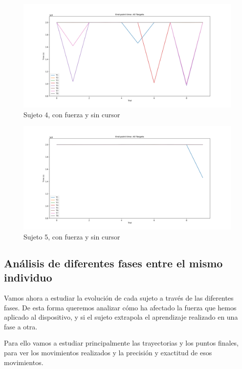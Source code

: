 \documentclass[a4paper,11pt, oneside]{book}
\begin{document}
\begin{figure}[H]
	\includegraphics[width=\linewidth]{sujeto4/force_no_cursor/evolution_time}
	\caption{Sujeto 4, con  fuerza y sin cursor}
	\label{4-4-3}
\end{figure}
\begin{figure}[H]
	\includegraphics[width=\linewidth]{sujeto5/force_no_cursor/evolution_time}
	\caption{Sujeto 5, con  fuerza y sin cursor}
	\label{5-4-3}
\end{figure}



\subsection{Análisis de diferentes fases entre el mismo individuo}

Vamos ahora a estudiar la evolución de cada sujeto a través de las diferentes fases. De esta forma queremos analizar cómo ha afectado la fuerza que hemos aplicado al dispositivo, y si el sujeto extrapola el aprendizaje realizado en una fase a otra.

Para ello vamos a estudiar principalmente las trayectorias y los puntos finales, para ver los movimientos realizados y la precisión y exactitud de esos movimientos.
\end{document}

